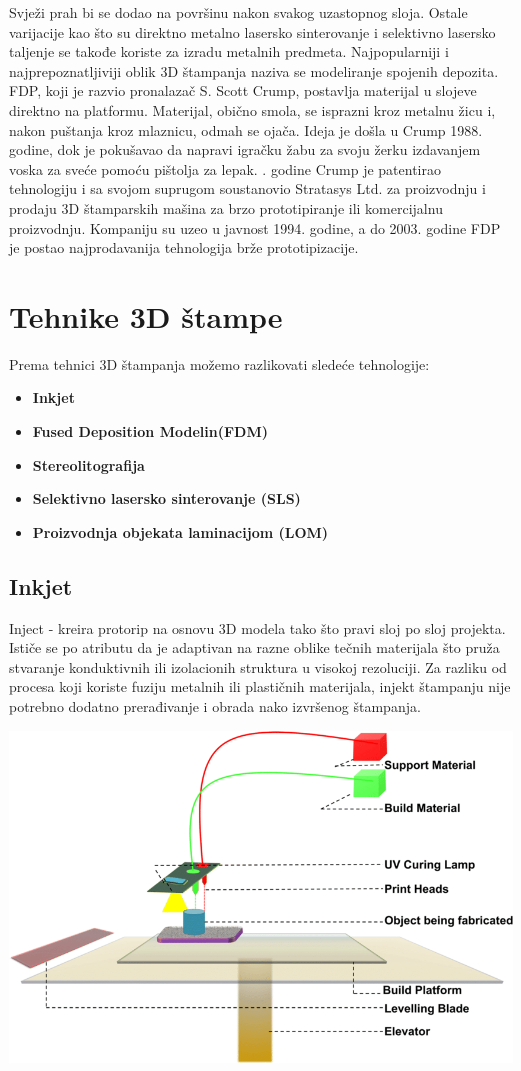 \documentclass[a4paper]{article}
\begin{document}
{\bigbreak Svježi prah bi se dodao na površinu nakon svakog uzastopnog sloja. Ostale varijacije kao što su direktno metalno lasersko sinterovanje i selektivno lasersko taljenje se takođe koriste za izradu metalnih predmeta. 
\bigbreak Najpopularniji i najprepoznatljiviji oblik 3D štampanja naziva se modeliranje spojenih depozita. FDP, koji je razvio pronalazač S. Scott Crump, postavlja materijal u slojeve direktno na platformu. Materijal, obično smola, se isprazni kroz metalnu žicu i, nakon puštanja kroz mlaznicu, odmah se ojača. Ideja je došla u Crump 1988. godine, dok je pokušavao da napravi igračku žabu za svoju žerku izdavanjem voska za sveće pomoću pištolja za lepak. 
. godine Crump je patentirao tehnologiju i sa svojom suprugom soustanovio Stratasys Ltd. za proizvodnju i prodaju 3D štamparskih mašina za brzo prototipiranje ili komercijalnu proizvodnju. 
Kompaniju su uzeo u javnost 1994. godine, a do 2003. godine FDP je postao najprodavanija tehnologija brže prototipizacije. 

\section{Tehnike 3D štampe}
\label{sec:naslov1}
Prema tehnici 3D štampanja možemo razlikovati sledeće tehnologije:
\begin{itemize}
\item \textbf{Inkjet}
\item \textbf{Fused Deposition Modelin(FDM)}
\item \textbf{Stereolitografija}
\item \textbf{Selektivno lasersko sinterovanje (SLS)}
\item \textbf{Proizvodnja objekata laminacijom (LOM)}
\end{itemize} 



 


\subsection{Inkjet}
\label{subsec:podnaslov1}
Inject - kreira protorip na osnovu 3D modela tako što pravi sloj po sloj projekta.
\bigbreak Ističe se po atributu da je adaptivan na razne oblike tečnih materijala što pruža stvaranje konduktivnih ili izolacionih struktura u visokoj rezoluciji. 
\bigbreak Za razliku od procesa koji koriste fuziju metalnih ili plastičnih materijala, injekt štampanju nije potrebno dodatno prerađivanje i obrada nako izvršenog štampanja.
\begin{center}
\includegraphics[width=.5\textwidth ]{Tehnikeslike/Inject.png}
\end{center}

}
\end{document}
